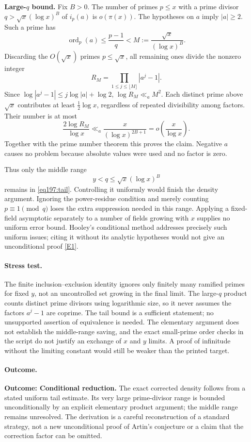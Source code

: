 \documentclass[11pt,a4paper]{article}
\newcommand{\eref}[2]{\hyperlink{extra:#1:#2}{[E#2]}}
\numberwithin{equation}{section}
\begin{document}
\textbf{Large-$q$ bound.} Fix $B>0$. The number of primes $p\le x$ with a prime divisor
$q>\sqrt x(\log x)^B$ of $i_p(a)$ is $o(\pi(x))$.
The hypotheses on $a$ imply $|a|\ge2$. Such a prime has
\[
 \operatorname{ord}_p(a)\le\frac{p-1}{q}<M:=\frac{\sqrt x}{(\log x)^B}.
\]
Discarding the $O(\sqrt x)$ primes $p\le\sqrt x$, all remaining ones divide the nonzero integer
\[
 R_M=\prod_{1\le j\le\lfloor M\rfloor}|a^j-1|.
\]
Since $\log|a^j-1|\le j\log|a|+\log2$,
$\log R_M\ll_a M^2$. Each distinct prime above $\sqrt x$ contributes at least $\tfrac12\log x$, regardless of repeated divisibility among factors. Their number is at most
\[
 \frac{2\log R_M}{\log x}
 \ll_a\frac{x}{(\log x)^{2B+1}}=o\!\left(\frac{x}{\log x}\right).
\]
Together with the prime number theorem this proves the claim. Negative $a$ causes no problem because absolute values were used and no factor is zero.

Thus only the middle range
\[
 y<q\le\sqrt x(\log x)^B
\]
remains in \eqref{eq197:tail}. Controlling it uniformly would finish the density argument. Ignoring the power-residue condition and merely counting $p\equiv1\pmod q$ loses the extra suppression needed in this range. Applying a fixed-field asymptotic separately to a number of fields growing with $x$ supplies no uniform error bound. Hooley's conditional method addresses precisely such uniform issues; citing it without its analytic hypotheses would not give an unconditional proof \eref{1183}{1}.

\paragraph{Stress test.}
The finite inclusion--exclusion identity ignores only finitely many ramified primes for fixed $y$, not an uncontrolled set growing in the final limit. The large-$q$ product counts distinct prime divisors using logarithmic size, so it never assumes the factors $a^j-1$ are coprime. The tail bound is a sufficient statement; no unsupported assertion of equivalence is needed. The elementary argument does not establish the middle-range saving, and the exact small-prime order checks in the script do not justify an exchange of $x$ and $y$ limits. A proof of infinitude without the limiting constant would still be weaker than the printed target.

\paragraph{Outcome.}
\textbf{Outcome: Conditional reduction.}
The exact corrected density follows from a stated uniform tail estimate. Its very large prime-divisor range is bounded unconditionally by an explicit elementary product argument; the middle range remains unresolved. The derivation is a careful reconstruction of a standard strategy, not a new unconditional proof of Artin's conjecture or a claim that the correction factor can be omitted.
\end{document}
